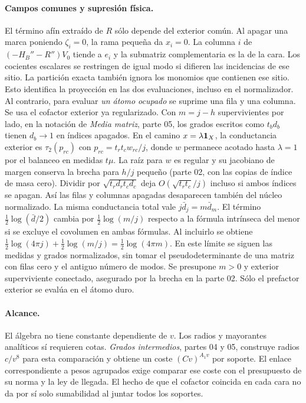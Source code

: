 \paragraph{Campos comunes y supresión física.}
El término afín extraído de $R$ sólo depende del exterior común. Al apagar una marca
poniendo $\zeta_i=0$, la rama pequeña da $x_i=0$. La columna $i$ de
$(-H_B''-R'')V_0$ tiende a $e_i$ y la submatriz complementaria es la de la cara.
Los cocientes escalares se restringen de igual modo si difieren las incidencias de
ese sitio. La partición exacta también ignora los monomios que contienen ese sitio.
Esto identifica la proyección en las dos evaluaciones, incluso en el normalizador.
Al contrario, para evaluar \emph{un átomo ocupado} se suprime una fila y una columna.
Se usa el cofactor exterior ya regularizado. Con $m=j-h$ supervivientes por lado,
en la notación de \emph{Media matriz}, parte 05, los grados escritos como $t_b d_b$
tienen $d_b\to1$ en índices apagados. En el camino $x=\lambda {\bf1}_X$,
la conductancia exterior es $\tau_2(p_{rc})$ con $p_{rc}=t_rt_c w_{rc}/j$,
donde $w$ permanece acotado hasta $\lambda=1$ por el balanceo en medidas $t\mu$.
La raíz para $w$ es regular y su jacobiano de margen conserva la brecha para
$h/j$ pequeño (parte 02, con las copias de índice de masa cero). Dividir por
$\sqrt{t_rd_rt_cd_c}$ deja $O(\sqrt{t_rt_c}/j)$ incluso si ambos índices se apagan.
Así las filas y columnas apagadas desaparecen también del núcleo normalizado.
La misma conductancia total vale $j\bar d_j=m\bar d_m$. El término
$\frac12\log(\bar d/2)$ cambia por $\frac12\log(m/j)$ respecto a la fórmula intrínseca
del menor si se excluye el covolumen en ambas fórmulas. Al incluirlo se obtiene
$\frac12\log(4\pi j)+\frac12\log(m/j)=\frac12\log(4\pi m)$.
En este límite se siguen las medidas y grados normalizados, sin tomar el
pseudodeterminante de una matriz con filas cero y el antiguo número de modos.
Se presupone $m>0$ y exterior superviviente conectado, asegurado por la brecha
en la parte 02. Sólo el prefactor exterior se evalúa en el átomo duro.
\paragraph{Alcance.}
El álgebra no tiene constante dependiente de $v$. Los radios y mayorantes analíticos
sí requieren cotas. \emph{Grados intermedios}, partes 04 y 05, construye radios
$c/v^8$ para esta comparación y obtiene un coste $(Cv)^{A_1v}$ por soporte.
El enlace correspondiente a pesos agrupados exige comparar ese coste con el
presupuesto de su norma y la ley de llegada. El hecho de que el cofactor coincida
en cada cara no da por sí solo sumabilidad al juntar todos los soportes.

